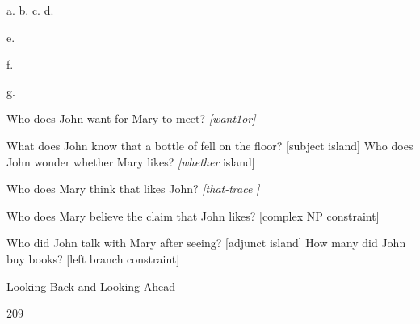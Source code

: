 \begin{multicols}{2}
\setcounter{listWWNumxivleveli}{1}
\begin{listWWNumxivleveli}
\item 
\begin{styleStandard}
a. b. c. d.
\end{styleStandard}


\end{listWWNumxivleveli}
\begin{styleStandard}
e.
\end{styleStandard}


\begin{styleStandard}
f.
\end{styleStandard}


\begin{styleTextbody}
g.
\end{styleTextbody}


\begin{styleStandard}
Who does John want for Mary to meet? \textit{[want}\textit{1}\textit{o}\textit{r}\textit{]}
\end{styleStandard}


\begin{styleStandard}
What does John know that a bottle of fell on the floor? [subject island] Who does John wonder whether Mary likes? \textit{[whether}\textit{ }island]
\end{styleStandard}


\begin{styleStandard}
Who does Mary think that likes John? \textit{[that-trace}\textit{ }\textit{]}
\end{styleStandard}


\begin{styleStandard}
Who does Mary believe the claim that John likes? [complex NP constraint]
\end{styleStandard}


\begin{styleStandard}
Who did John talk with Mary after seeing? [adjunct island] How many did John buy books? [left branch constraint]
\end{styleStandard}


\end{multicols}
\clearpage\setcounter{page}{1}\begin{styleStandard}
Looking Back and Looking Ahead
\end{styleStandard}


\begin{styleStandard}
209
\end{styleStandard}


